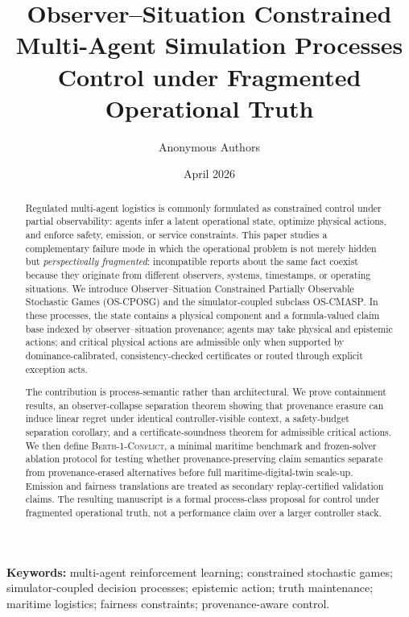 \documentclass[11pt]{article}
\title{Observer--Situation Constrained Multi-Agent Simulation Processes\\[-0.15em]
\large Control under Fragmented Operational Truth}
\author{Anonymous Authors}
\date{April 2026}
\newcommand{\OSCPOSG}{\mbox{\normalfont\textsc{OS-CPOSG}}}
\newcommand{\OSCMASP}{\mbox{\normalfont\textsc{OS-CMASP}}}
\newcommand{\1}{\mathbf{1}}
\theoremstyle{definition}
\theoremstyle{plain}
\theoremstyle{remark}
\begin{document}
\maketitle


\begin{abstract}
Regulated multi-agent logistics is commonly formulated as constrained control under partial observability: agents infer a latent operational state, optimize physical actions, and enforce safety, emission, or service constraints. This paper studies a complementary failure mode in which the operational problem is not merely hidden but \emph{perspectivally fragmented}: incompatible reports about the same fact coexist because they originate from different observers, systems, timestamps, or operating situations. We introduce Observer--Situation Constrained Partially Observable Stochastic Games (\OSCPOSG) and the simulator-coupled subclass \OSCMASP. In these processes, the state contains a physical component and a formula-valued claim base indexed by observer--situation provenance; agents may take physical and epistemic actions; and critical physical actions are admissible only when supported by dominance-calibrated, consistency-checked certificates or routed through explicit exception acts.

The contribution is process-semantic rather than architectural. We prove containment results, an observer-collapse separation theorem showing that provenance erasure can induce linear regret under identical controller-visible context, a safety-budget separation corollary, and a certificate-soundness theorem for admissible critical actions. We then define \textsc{Berth-1-Conflict}, a minimal maritime benchmark and frozen-solver ablation protocol for testing whether provenance-preserving claim semantics separate from provenance-erased alternatives before full maritime-digital-twin scale-up. Emission and fairness translations are treated as secondary replay-certified validation claims. The resulting manuscript is a formal process-class proposal for control under fragmented operational truth, not a performance claim over a larger controller stack.
\end{abstract}

\noindent\textbf{Keywords:} multi-agent reinforcement learning; constrained stochastic games; simulator-coupled decision processes; epistemic action; truth maintenance; maritime logistics; fairness constraints; provenance-aware control.

\tableofcontents
\end{document}
